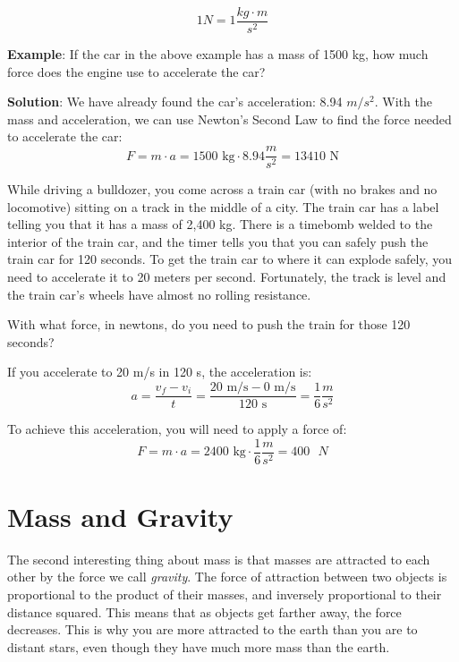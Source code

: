 $$1 N = 1 \frac{kg \cdot m}{s^2}$$

\textbf{Example}: If the car in the above example has a mass of 1500 kg, how much force does the engine use to accelerate the car?

\textbf{Solution}: We have already found the car's acceleration: 8.94 $m/s^2$. With the mass and acceleration, we can use Newton's Second Law to find the force needed to accelerate the car:
$$F = m \cdot a = 1500\text{ kg} \cdot 8.94 \frac{m}{s^2} = 13410\text{ N}$$

\begin{Exercise}[title={Acceleration}, label=acceleration_train]

While driving a bulldozer, you come across a train car (with no brakes
and no locomotive) sitting on a track in the middle of a city. The train car
has a label telling you that it has a mass of 2,400 kg. There is a timebomb
welded to the interior of the train car, and the timer tells you that
you can safely push the train car for 120 seconds. To get the train
car to where it can explode safely, you need to accelerate it to 20 meters per
second. Fortunately, the track is level and the train car's wheels have
almost no rolling resistance.

With what force, in newtons, do you need to push the train for those 120 seconds?

\end{Exercise}
\begin{Answer}[ref=acceleration_train]
If you accelerate to 20 m/s in 120 s, the acceleration is:
$$a = \frac{v_f - v_i}{t} = \frac{20\text{ m/s} - 0\text{ m/s}}{120\text{ s}} = \frac{1}{6} \frac{m}{s^2}$$

To achieve this acceleration, you will need to apply a force of:
$$F = m \cdot a = 2400\text{ kg} \cdot \frac{1}{6} \frac{m}{s^2} = 400\text{ }N$$
\end{Answer}

\section{Mass and Gravity}

The second interesting thing about mass is that masses are
attracted to each other by the force we call \textit{gravity}. The
force of attraction between two objects is proportional to the product
of their masses, and inversely proportional to their distance squared.
This means that as objects get farther away, the force decreases.
This is why you are more attracted to the earth than you are to
distant stars, even though they have much more mass than the earth.

